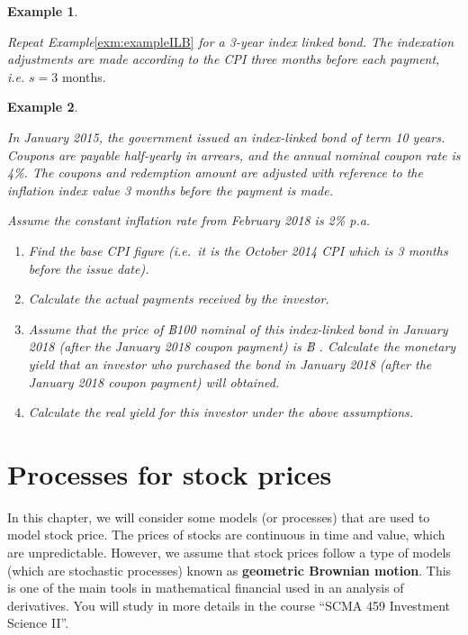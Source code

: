 \documentclass[
]{book}
\theoremstyle{definition}
\theoremstyle{definition}
\newtheorem{example}{Example}[chapter]
\theoremstyle{definition}
\theoremstyle{definition}
\theoremstyle{remark}
\begin{document}
\begin{example}
\protect\hypertarget{exm:unlabeled-div-64}{}\label{exm:unlabeled-div-64}

\emph{Repeat Example}\ref{exm:exampleILB} \emph{for a 3-year index linked bond.
The indexation adjustments are made according to the CPI three months
before each payment, i.e.} \(s = 3\) months.

\end{example}

\begin{example}
\protect\hypertarget{exm:exampleILB2}{}\label{exm:exampleILB2}

\emph{In January 2015, the government issued an index-linked bond of term 10
years. Coupons are payable half-yearly in arrears, and the annual
nominal coupon rate is 4\%. The coupons and redemption amount are
adjusted with reference to the inflation index value 3 months before the
payment is made.}

\emph{Assume the constant inflation rate from February 2018 is 2\% p.a.}

\begin{enumerate}
\def\labelenumi{\arabic{enumi}.}
\item
  \emph{Find the base CPI figure (i.e.~it is the October 2014 CPI which is
  3 months before the issue date).}
\item
  \emph{Calculate the actual payments received by the investor.}
\item
  \emph{Assume that the price of ฿100 nominal of this index-linked bond in
  January 2018 (after the January 2018 coupon payment) is ฿ .
  Calculate the monetary yield that an investor who purchased the bond
  in January 2018 (after the January 2018 coupon payment) will
  obtained.}
\item
  \emph{Calculate the real yield for this investor under the above
  assumptions.}
\end{enumerate}

\end{example}

\hypertarget{processes-for-stock-prices}{%
\chapter{Processes for stock prices}\label{processes-for-stock-prices}}

In this chapter, we will consider some models (or processes) that are
used to model stock price. The prices of stocks are continuous in time
and value, which are unpredictable. However, we assume that stock prices
follow a type of models (which are stochastic processes) known as
\textbf{geometric Brownian motion}. This is one of the main tools in
mathematical financial used in an analysis of derivatives. You will
study in more details in the course ``SCMA 459 Investment Science II''.
\end{document}

